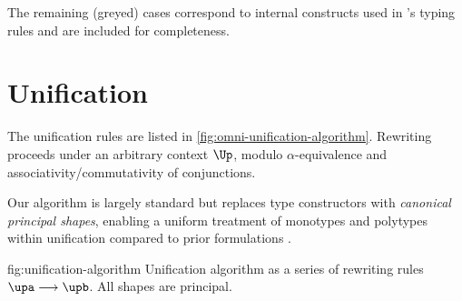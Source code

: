 \documentclass[acmsmall,screen,nonacm,review]{acmart}
\begin{document}
The remaining (greyed) cases  correspond to internal
constructs used in \OML's typing rules and are included for completeness.


\section{Unification}
\label{app:unification}

The unification rules are listed in \cref{fig:omni-unification-algorithm}.
Rewriting proceeds under an arbitrary context $\Up$, modulo $\alpha$-equivalence
and associativity/commutativity of conjunctions.

Our algorithm is largely standard \cite{Pottier-Remy/emlti} but replaces type
constructors with \emph{canonical principal shapes}, enabling a uniform
treatment of monotypes and polytypes within unification compared to
prior formulations \citep{Garrigue-Remy/poly-ml}.

%


\begin{mathparfig}[htpb!]
  {fig:unification-algorithm}
  {Unification algorithm as a series of rewriting rules
   $\upa \unif \upb$. All shapes are principal.}
   \rewrite[U-Exists]
      {(\cexists \alpha \upa) \cand \upb \\ \tv \disjoint \upb}
      {\cexists \tv {\upa \cand \upb}}

    \rewrite[U-Cycle]
      {\up \\ \cyclic \up}
      {\cfalse}

    \rewrite[U-True]
      {\up \cand \ctrue}
      {\up}

    \rewrite[U-False]
      {\Up\where\cfalse \\ \Up \neq \square}
      {\cfalse}

    \rewrite[U-Merge]
      {\cunif \tv \ueqa \cand \cunif \tv \ueqb}
      {\cunif \tv {\cunif \ueqa \ueqb}}

    \rewrite[U-Stutter]
      {\cunif \tv {\cunif \tv \ueq}}
      {\cunif \tv \ueq}

    \rewrite[U-Name]
      {\cunif {\pshapp \parens{\tys, \ti, \typs}} \ueq \\ \tv \disjoint \tys, \typs, \ueq }
      {\cexists \tv {\cunif \tv \ti \cand \cunif {\pshapp \parens{\tys, \tv, \typs}} \ueq}}

    \rewrite[U-Decomp]
      {\cunif {\pshapp \tvs} {\cunif {\pshapp \tvbs} \ueq}}
      {\cunif {\pshapp \tvs} \ueq \cand \cunif \tvs \tvbs}

    \rewrite[U-Clash]
      {\cunif {\pshapp \tvs} {\cunif {\pshapp[\shp]\tvbs } \ueq }\\
       \sh \neq \shp}
      {\cfalse}

      {\ctrue}
\end{mathparfig}
\end{document}
